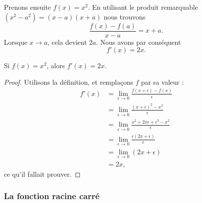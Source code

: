 Prenons ensuite \( f(x)=x^2\). En utilisant le produit remarquable \( (x^2-a^2)=(x-a)(x+a)\) nous trouvons
\begin{equation}
	\frac{ f(x)-f(a) }{ x-a }=x+a.
\end{equation}
Lorsque \( x\to a\), cela devient \( 2a\). Nous avons par conséquent
\begin{equation}
	f'(x)=2x.
\end{equation}

\begin{lemma}           \label{LemDeccCarr}
	Si \( f(x)=x^2\), alors \( f'(x)=2x\).
\end{lemma}

\begin{proof}
	Utilisons la définition, et remplaçons \( f\) par sa valeur :
	\begin{subequations}
		\begin{align}
			f'(x) & =\lim_{\epsilon\to 0}\frac{ f(x+\epsilon)-f(x) }{ \epsilon }            \\
			      & =\lim_{\epsilon\to 0}\frac{ (x+\epsilon)^2-x^2 }{ \epsilon }            \\
			      & =\lim_{\epsilon\to 0}\frac{ x^2+2x\epsilon+\epsilon^2-x^2 }{ \epsilon } \\
			      & =\lim_{\epsilon\to 0}\frac{\epsilon(2x+\epsilon)}{ \epsilon }           \\
			      & =\lim_{\epsilon\to 0}(2x+\epsilon)                                      \\
			      & =2x,
		\end{align}
	\end{subequations}
	ce qu'il fallait prouver.
\end{proof}


\subsubsection{La fonction racine carré}

